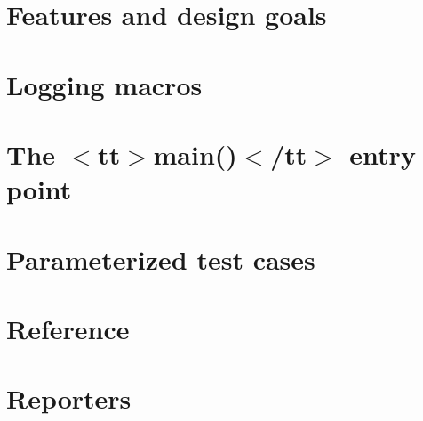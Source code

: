 \let\mypdfximage\pdfximage\def\pdfximage{\immediate\mypdfximage}\documentclass[twoside]{book}
\newcommand{\+}{\discretionary{\mbox{\scriptsize$\hookleftarrow$}}{}{}}
\begin{document}
\chapter{Features and design goals}
\label{md__c___users__u_s_e_r_source_repos_bzareva_star_wars_universe_0_1_doctest_doc_markdown_features}

\chapter{Logging macros}
\label{md__c___users__u_s_e_r_source_repos_bzareva_star_wars_universe_0_1_doctest_doc_markdown_logging}

\chapter{The $<$tt$>$main()$<$/tt$>$ entry point}
\label{md__c___users__u_s_e_r_source_repos_bzareva_star_wars_universe_0_1_doctest_doc_markdown_main}

\chapter{Parameterized test cases}
\label{md__c___users__u_s_e_r_source_repos_bzareva_star_wars_universe_0_1_doctest_doc_markdown_parameterized_tests}

\chapter{Reference}
\label{md__c___users__u_s_e_r_source_repos_bzareva_star_wars_universe_0_1_doctest_doc_markdown_readme}

\chapter{Reporters}
\label{md__c___users__u_s_e_r_source_repos_bzareva_star_wars_universe_0_1_doctest_doc_markdown_reporters}

\end{document}
